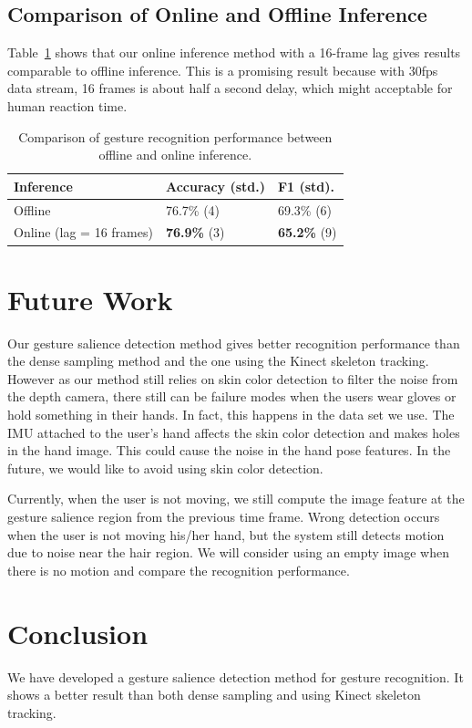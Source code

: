 \documentclass{sigchi}
\newcommand\tabhead[1]{\small\textbf{#1}}
\begin{document}
\subsection{Comparison of Online and Offline Inference}
Table~\ref{tab:inference} shows that our online inference method with a 16-frame lag gives results comparable to offline inference. This is a promising result because with 30fps data
stream, 16 frames is about half a second delay, which might acceptable for human
reaction time.

\begin{table}[t]
\centering
\begin{tabular}{|l|l|l|}
\hline
\tabhead{Inference} & {\tabhead{Accuracy (std.)}} & {\tabhead{F1 (std).}}\\
\hline
Offline & 76.7\% (4) & 69.3\% (6) \\
\hline
Online (lag = 16 frames) & \textbf{76.9\%} (3) & \textbf{65.2\%} (9) \\ 
\hline
\end{tabular}
\caption{Comparison of gesture recognition performance between offline and online inference. }
\label{tab:inference}
\end{table}


\section{Future Work}
Our gesture salience detection method gives better recognition performance than the dense sampling method and
the one using the Kinect skeleton tracking. However as our method still relies on skin color detection to filter
the noise from the depth camera, there still can be failure modes when the users wear gloves or hold something
in their hands. In fact, this happens in the data set we use. The IMU attached to the user's hand affects the 
skin color detection and makes holes in the hand image. This could cause the noise in the hand pose features. In the future,
we would like to avoid using skin color detection. 

Currently, when the user is not moving, we still compute the image feature at the gesture salience region from the previous time frame.
Wrong detection occurs when the user is not moving his/her hand, but the system still detects motion due to noise near the hair region.
We will consider using an empty image when there is no motion and compare the recognition performance.

\section{Conclusion}
We have developed a gesture salience detection method for gesture recognition. It shows a better result than both dense sampling and using 
Kinect skeleton tracking.
\end{document}
